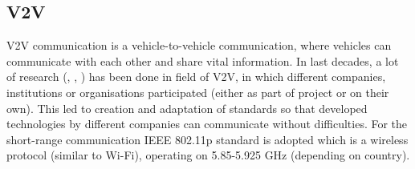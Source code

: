 \subsection{V2V}

V2V communication is a vehicle-to-vehicle communication, where vehicles can communicate with each other and share vital information. In last decades, a lot of research (\cite{Chan2012ProjectSARTRE}, \cite{Safespot}, \cite{2016CompanionProject}) has been done in field of V2V, in which different companies, institutions or organisations participated (either as part of project or on their own). This led to creation and adaptation of standards so that developed technologies by different companies can communicate without difficulties. For the short-range communication IEEE 802.11p standard is adopted which is a wireless protocol (similar to Wi-Fi), operating on 5.85-5.925 GHz (depending on country).









